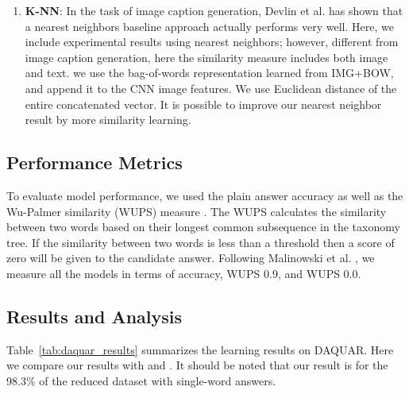 \documentclass{article} %
\renewcommand{\#}[1]{\textbf{#1}}
\begin{document}
\begin{enumerate}[leftmargin=*]
\item \#{K-NN}: In the task of image caption generation, Devlin et al. \cite{devlin15} has 
shown that a nearest neighbors baseline approach actually performs very well. Here,
we include experimental results using nearest neighbors; however, different from 
image caption generation, here the similarity measure includes both image and text. 
we use the bag-of-words representation learned from IMG+BOW, and append it to the CNN image
features. We use Euclidean distance of the entire concatenated vector. It is possible to improve
our nearest neighbor result by more similarity learning.

\end{enumerate}


\subsection{Performance Metrics}

To evaluate model performance, we used the plain answer accuracy as well as
the Wu-Palmer similarity (WUPS) measure \cite{wu94, malinowski14b}. The WUPS
calculates the similarity between two words based on their longest common
subsequence in the taxonomy tree. If the similarity between two words is less
than a threshold then a score of zero will be given to the candidate answer.
Following Malinowski et al. \cite{malinowski14b}, we measure all the models in
terms of accuracy, WUPS 0.9, and WUPS 0.0.

\subsection{Results and Analysis}

Table~\ref{tab:daquar_results} summarizes the learning results on DAQUAR. Here
we compare our results with \cite{malinowski14b} and \cite{malinowski15}. It
should be noted that our result is for the 98.3\% of the reduced dataset with
single-word answers.
\end{document}
